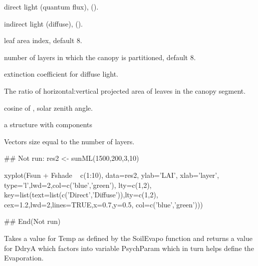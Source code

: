 \documentclass[letterpaper]{book}
\begin{document}
\begin{Arguments}
\begin{ldescription}
\item[\code{I.dir}] direct light (quantum flux), ().

\item[\code{I.diff}] indirect light (diffuse), ().

\item[\code{LAI}] leaf area index, default 8.

\item[\code{nlayers}] number of layers in which the canopy is
partitioned, default 8.

\item[\code{kd}] extinction coefficient for diffuse light.

\item[\code{chi.l}] The ratio of horizontal:vertical projected
area of leaves in the canopy segment.

\item[\code{cos.theta}] cosine of \eqn{\theta}{}, solar
zenith angle.
\end{ldescription}
\end{Arguments}
%
\begin{Value}
a  structure with components

Vectors size equal to the number of layers.
\end{Value}
%
\begin{Examples}
\begin{ExampleCode}
## Not run: 
res2 <- sunML(1500,200,3,10)

xyplot(Fsun + Fshade ~ c(1:10), data=res2,
       ylab='LAI',
       xlab='layer',
       type='l',lwd=2,col=c('blue','green'),
       lty=c(1,2),
       key=list(text=list(c('Direct','Diffuse')),lty=c(1,2),
                cex=1.2,lwd=2,lines=TRUE,x=0.7,y=0.5,
                col=c('blue','green')))

## End(Not run)
\end{ExampleCode}
\end{Examples}
%
\begin{Description}\relax
Takes a value for Temp as defined by the SoilEvapo function
and returns a value for DdryA which factors into variable
PsychParam which in turn helps define the Evaporation.
\end{Description}
\end{document}
